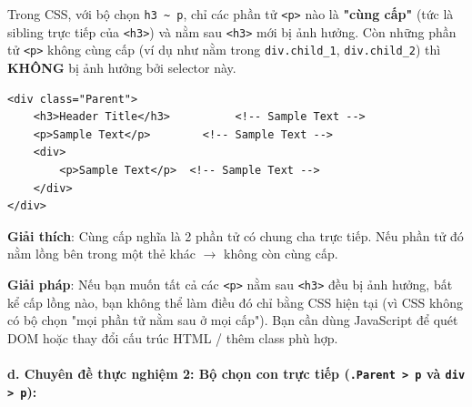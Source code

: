 \documentclass[11pt,oneside]{book}
\newcommand{\codeinline}[1]{\textcolor{accentOrange}{\texttt{#1}}}
\begin{document}
\begin{conceptBox}
\begin{center}
\end{center}
\end{conceptBox}

\begin{warnBox}
Trong CSS, với bộ chọn \codeinline{h3 \textasciitilde{} p}, chỉ các phần tử \codeinline{<p>} nào là \textbf{"cùng cấp"} (tức là sibling trực tiếp của \codeinline{<h3>}) và nằm sau \codeinline{<h3>} mới bị ảnh hưởng. Còn những phần tử \codeinline{<p>} không cùng cấp (ví dụ như nằm trong \codeinline{div.child\_1}, \codeinline{div.child\_2}) thì \textbf{KHÔNG} bị ảnh hưởng bởi selector này.
\par\vspace{3pt}
\begin{codeWindow}
\begin{lstlisting}[language=HTML5]
<div class="Parent">
    <h3>Header Title</h3>          <!-- Sample Text -->
    <p>Sample Text</p>        <!-- Sample Text -->
    <div>
        <p>Sample Text</p>  <!-- Sample Text -->
    </div>
</div>
\end{lstlisting}
\end{codeWindow}
\textbf{Giải thích}: Cùng cấp nghĩa là 2 phần tử có chung cha trực tiếp. Nếu phần tử đó nằm lồng bên trong một thẻ khác $\rightarrow$ không còn cùng cấp.
\par\vspace{3pt}
\textbf{Giải pháp}: Nếu bạn muốn tất cả các \codeinline{<p>} nằm sau \codeinline{<h3>} đều bị ảnh hưởng, bất kể cấp lồng nào, bạn không thể làm điều đó chỉ bằng CSS hiện tại (vì CSS không có bộ chọn "mọi phần tử nằm sau ở mọi cấp"). Bạn cần dùng JavaScript để quét DOM hoặc thay đổi cấu trúc HTML / thêm class phù hợp.
\end{warnBox}

\paragraph{d. Chuyên đề thực nghiệm 2: Bộ chọn con trực tiếp (\codeinline{.Parent > p} và \codeinline{div > p}):}
\end{document}
